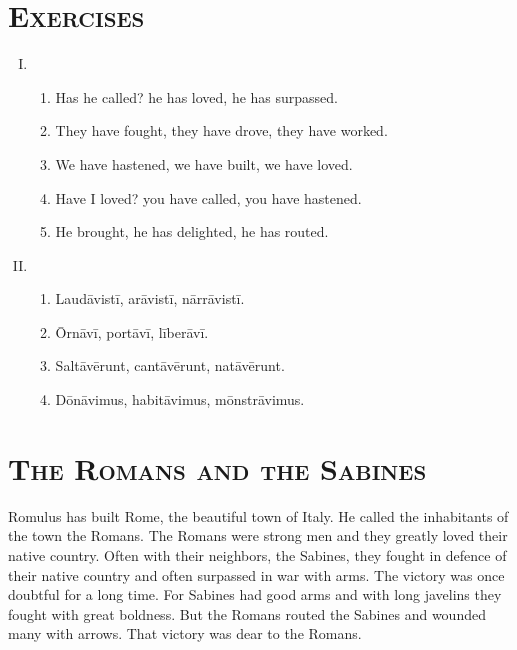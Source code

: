 \documentclass[12pt]{article}
\begin{document}
\section{\textsc{Exercises}}
\begin{enumerate}[I.]
	\setlength{\itemsep}{1em}
	\item \begin{enumerate}[1)]
		\item Has he called? he has loved, he has surpassed.
		\item They have fought, they have drove, they have worked.
		\item We have hastened, we have built, we have loved.
		\item Have I loved? you have called, you have hastened.
		\item He brought, he has delighted, he has routed.
	\end{enumerate}
	\item \begin{enumerate}[1)]
		\item Laudāvistī, arāvistī, nārrāvistī.
		\item Ōrnāvī, portāvī, līberāvī.
		\item Saltāvērunt, cantāvērunt, natāvērunt.
		\item Dōnāvimus, habitāvimus, mōnstrāvimus.
	\end{enumerate}
\end{enumerate}

\section{\textsc{The Romans and the Sabines}}

Romulus has built Rome, the beautiful town of Italy. He called the inhabitants of the town the Romans. The Romans were strong men and they greatly loved their native country. Often with their neighbors, the Sabines, they fought in defence of their native country and often surpassed in war with arms. The victory was once doubtful for a long time. For Sabines had good arms and with long javelins they fought with great boldness. But the Romans routed the Sabines and wounded many with arrows. That victory was dear to the Romans.
\end{document}
